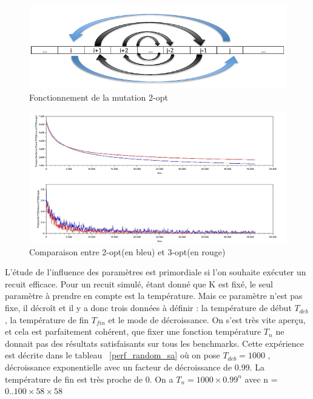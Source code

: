 \documentclass{article}%
\begin{document}
	\begin{figure}[!h]
		
	\begin{center}
	\includegraphics[scale=0.25]{2opt.png}
	\caption{Fonctionnement de la mutation 2-opt}
	\label{2opt}
	\end{center}
	\end{figure}
	
	\begin{figure}[!h]
		
	\begin{center}
	\includegraphics[scale=0.25]{pr1002_mutation.jpg}
	\caption{Comparaison entre 2-opt(en bleu) et 3-opt(en rouge)}
	\label{mutations}
	\end{center}
	\end{figure}
			
			L'étude de l'influence des paramètres est primordiale si l'on souhaite exécuter un recuit efficace. Pour un recuit simulé, étant donné que K est fixé, le seul paramètre à prendre en compte est la température. Mais ce paramètre n'est pas fixe, il décroît et il y a donc trois données à définir : la température de début $ T_{deb} $, la température de fin $T_{fin} $ et le mode de décroissance. On s'est très vite aperçu, et cela est parfaitement cohérent, que fixer une fonction température $ T_{n} $ ne donnait pas des résultats satisfaisants sur tous les benchmarks. Cette expérience est décrite dans le tableau ~\ref{perf_random_sa} où on pose $ T_{deb} = 1000 $ , décroissance exponentielle avec un facteur de décroissance de 0.99. La température de fin est très proche de 0. On a $ T_{n} = 1000 \times 0.99^{n} $ avec n = $0..100 \times 58 \times 58 $
			
\end{document}
